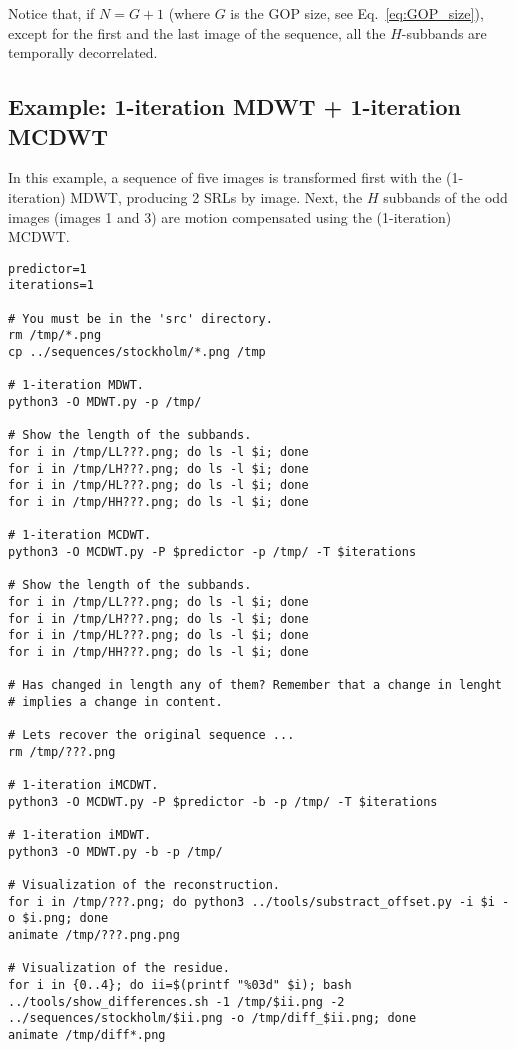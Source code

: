 Notice that, if $N=G+1$ (where $G$ is the GOP size, see
Eq.~\ref{eq:GOP_size}), except for the first and the last image of the
sequence, all the $H$-subbands are temporally decorrelated.

\subsection*{Example: 1-iteration MDWT + 1-iteration MCDWT}
In this example, a sequence of five images is transformed first with
the (1-iteration) MDWT, producing 2 SRLs by image. Next, the $H$
subbands of the odd images (images 1 and 3) are motion compensated
using the (1-iteration) MCDWT.

\begin{verbatim}
predictor=1
iterations=1

# You must be in the 'src' directory.
rm /tmp/*.png
cp ../sequences/stockholm/*.png /tmp

# 1-iteration MDWT.
python3 -O MDWT.py -p /tmp/

# Show the length of the subbands.
for i in /tmp/LL???.png; do ls -l $i; done
for i in /tmp/LH???.png; do ls -l $i; done
for i in /tmp/HL???.png; do ls -l $i; done
for i in /tmp/HH???.png; do ls -l $i; done

# 1-iteration MCDWT.
python3 -O MCDWT.py -P $predictor -p /tmp/ -T $iterations

# Show the length of the subbands.
for i in /tmp/LL???.png; do ls -l $i; done
for i in /tmp/LH???.png; do ls -l $i; done
for i in /tmp/HL???.png; do ls -l $i; done
for i in /tmp/HH???.png; do ls -l $i; done

# Has changed in length any of them? Remember that a change in lenght
# implies a change in content.

# Lets recover the original sequence ...
rm /tmp/???.png

# 1-iteration iMCDWT.
python3 -O MCDWT.py -P $predictor -b -p /tmp/ -T $iterations

# 1-iteration iMDWT.
python3 -O MDWT.py -b -p /tmp/

# Visualization of the reconstruction.
for i in /tmp/???.png; do python3 ../tools/substract_offset.py -i $i -o $i.png; done
animate /tmp/???.png.png

# Visualization of the residue.
for i in {0..4}; do ii=$(printf "%03d" $i); bash ../tools/show_differences.sh -1 /tmp/$ii.png -2 ../sequences/stockholm/$ii.png -o /tmp/diff_$ii.png; done
animate /tmp/diff*.png
\end{verbatim}

